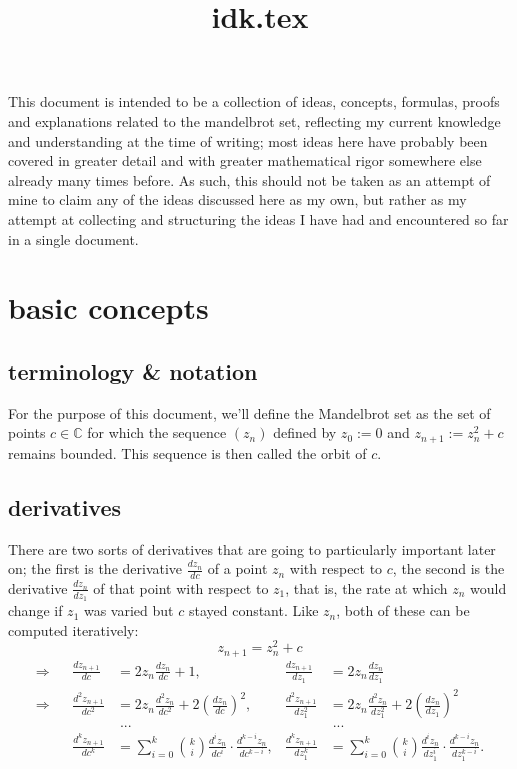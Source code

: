 \documentclass[12pt,a4paper]{article}
\begin{document}
\title{idk.tex}
\author{}
\date{}
\maketitle

This document is intended to be a collection of ideas, concepts, formulas, proofs and explanations related to the mandelbrot set, reflecting my current knowledge and understanding at the time of writing; most ideas here have probably been covered in greater detail and with greater mathematical rigor somewhere else already many times before. As such, this should not be taken as an attempt of mine to claim any of the ideas discussed here as my own, but rather as my attempt at collecting and structuring the ideas I have had and encountered so far in a single document.

\section{basic concepts}

\subsection{terminology \& notation}

For the purpose of this document, we'll define the Mandelbrot set as the set of points $c\in\mathbb C$ for which the sequence $(z_n)$ defined by $z_0:=0$ and $z_{n+1}:=z_n^2+c$ remains bounded. This sequence is then called the orbit of $c$.

\subsection{derivatives}

There are two sorts of derivatives that are going to particularly important later on; the first is the derivative $\frac{dz_n}{dc}$ of a point $z_n$ with respect to $c$, the second is the derivative $\frac{dz_n}{dz_1}$ of that point with respect to $z_1$, that is, the rate at which $z_n$ would change if $z_1$ was varied but $c$ stayed constant. Like $z_n$, both of these can be computed iteratively:
$$z_{n+1}=z_n^2+c$$
\begin{align*}
	\Rightarrow&&\frac{dz_{n+1}}{dc}&=2z_n\frac{dz_n}{dc}+1,&\frac{dz_{n+1}}{dz_1}&=2z_n\frac{dz_n}{dz_1}\\
	\Rightarrow&&\frac{d^2z_{n+1}}{dc^2}&=2z_n\frac{d^2z_n}{dc^2}+2\left(\frac{dz_n}{dc}\right)^2,&\frac{d^2z_{n+1}}{dz_1^2}&=2z_n\frac{d^2z_n}{dz_1^2}+2\left(\frac{dz_n}{dz_1}\right)^2\\
	&&&\;...&&\;...\\
	&&\frac{d^kz_{n+1}}{dc^k}&=\sum_{i=0}^k\binom ki\frac{d^iz_n}{dc^i}\cdot\frac{d^{k-i}z_n}{dc^{k-i}},&\frac{d^kz_{n+1}}{dz_1^k}&=\sum_{i=0}^k\binom ki\frac{d^iz_n}{dz_1^i}\cdot\frac{d^{k-i}z_n}{dz_1^{k-i}}.
\end{align*}
\end{document}
